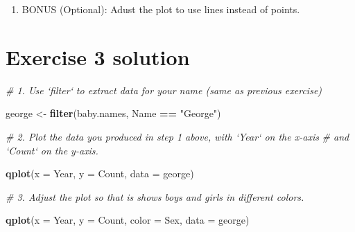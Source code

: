 \documentclass[]{book}
\newenvironment{Shaded}{\begin{snugshade}}{\end{snugshade}}
\newcommand{\KeywordTok}[1]{\textcolor[rgb]{0.13,0.29,0.53}{\textbf{#1}}}
\newcommand{\DataTypeTok}[1]{\textcolor[rgb]{0.13,0.29,0.53}{#1}}
\newcommand{\StringTok}[1]{\textcolor[rgb]{0.31,0.60,0.02}{#1}}
\newcommand{\CommentTok}[1]{\textcolor[rgb]{0.56,0.35,0.01}{\textit{#1}}}
\newcommand{\OperatorTok}[1]{\textcolor[rgb]{0.81,0.36,0.00}{\textbf{#1}}}
\newcommand{\NormalTok}[1]{#1}
\providecommand{\tightlist}{%
  \setlength{\itemsep}{0pt}\setlength{\parskip}{0pt}}
\begin{document}
\begin{enumerate}
\def\labelenumi{\arabic{enumi}.}
\setcounter{enumi}{3}
\tightlist
\item
  BONUS (Optional): Adust the plot to use lines instead of points.
\end{enumerate}

\section{Exercise 3 solution}\label{exercise-3-solution}

\begin{Shaded}
\begin{Highlighting}[]
\CommentTok{# 1. Use `filter` to extract data for your name (same as previous exercise)  }
\end{Highlighting}
\end{Shaded}

\begin{Shaded}
\begin{Highlighting}[]
\NormalTok{george <-}\StringTok{ }\KeywordTok{filter}\NormalTok{(baby.names, Name }\OperatorTok{==}\StringTok{ "George"}\NormalTok{)}
\end{Highlighting}
\end{Shaded}

\begin{Shaded}
\begin{Highlighting}[]
\CommentTok{# 2.  Plot the data you produced in step 1 above, with `Year` on the x-axis}
\CommentTok{#     and `Count` on the y-axis.}
\end{Highlighting}
\end{Shaded}

\begin{Shaded}
\begin{Highlighting}[]
\KeywordTok{qplot}\NormalTok{(}\DataTypeTok{x =}\NormalTok{ Year, }\DataTypeTok{y =}\NormalTok{ Count, }\DataTypeTok{data =}\NormalTok{ george)}
\end{Highlighting}
\end{Shaded}

\begin{Shaded}
\begin{Highlighting}[]
\CommentTok{# 3. Adjust the plot so that is shows boys and girls in different colors.}
\end{Highlighting}
\end{Shaded}

\begin{Shaded}
\begin{Highlighting}[]
\KeywordTok{qplot}\NormalTok{(}\DataTypeTok{x =}\NormalTok{ Year, }\DataTypeTok{y =}\NormalTok{ Count, }\DataTypeTok{color =}\NormalTok{ Sex, }\DataTypeTok{data =}\NormalTok{ george)}
\end{Highlighting}
\end{Shaded}
\end{document}
